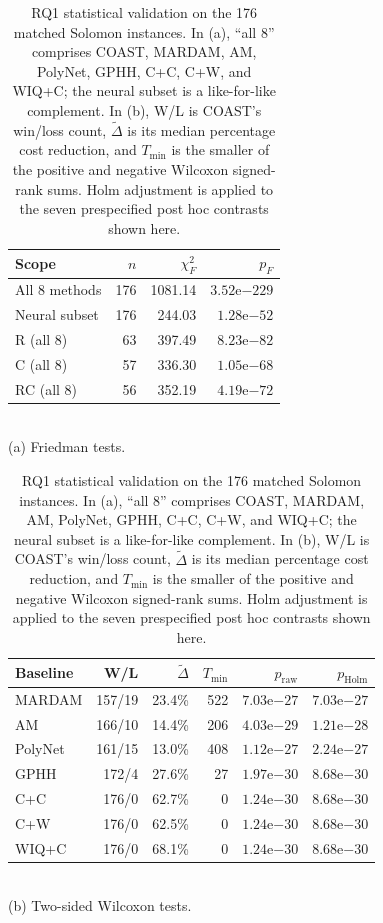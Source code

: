 \documentclass[letterpaper]{article}
\begin{document}
\begin{table}[t]
\centering
\begin{minipage}[t]{0.34\textwidth}
\centering
{\small
\setlength{\tabcolsep}{3.2pt}
\begin{tabular}{lrrr}
\toprule
Scope & $n$ & $\chi^2_F$ & $p_F$ \\
\midrule
All 8 methods & 176 & 1081.14 & $3.52\mathrm{e}{-229}$ \\
Neural subset & 176 & 244.03 & $1.28\mathrm{e}{-52}$ \\
R (all 8) & 63 & 397.49 & $8.23\mathrm{e}{-82}$ \\
C (all 8) & 57 & 336.30 & $1.05\mathrm{e}{-68}$ \\
RC (all 8) & 56 & 352.19 & $4.19\mathrm{e}{-72}$ \\
\bottomrule
\end{tabular}
}\\[1pt]
\footnotesize (a) Friedman tests.
\end{minipage}\hfill
\begin{minipage}[t]{0.62\textwidth}
\centering
{\small
\setlength{\tabcolsep}{3.0pt}
\begin{tabular}{lrrrrr}
\toprule
Baseline & W/L & $\tilde{\Delta}$ & $T_{\min}$ & $p_{\mathrm{raw}}$ & $p_{\mathrm{Holm}}$ \\
\midrule
MARDAM  & 157/19 & 23.4\% & 522 & $7.03\mathrm{e}{-27}$ & $7.03\mathrm{e}{-27}$ \\
AM      & 166/10 & 14.4\% & 206 & $4.03\mathrm{e}{-29}$ & $1.21\mathrm{e}{-28}$ \\
PolyNet & 161/15 & 13.0\% & 408 & $1.12\mathrm{e}{-27}$ & $2.24\mathrm{e}{-27}$ \\
GPHH    & 172/4  & 27.6\% & 27  & $1.97\mathrm{e}{-30}$ & $8.68\mathrm{e}{-30}$ \\
C+C     & 176/0  & 62.7\% & 0   & $1.24\mathrm{e}{-30}$ & $8.68\mathrm{e}{-30}$ \\
C+W     & 176/0  & 62.5\% & 0   & $1.24\mathrm{e}{-30}$ & $8.68\mathrm{e}{-30}$ \\
WIQ+C   & 176/0  & 68.1\% & 0   & $1.24\mathrm{e}{-30}$ & $8.68\mathrm{e}{-30}$ \\
\bottomrule
\end{tabular}
}\\[1pt]
\footnotesize (b) Two-sided Wilcoxon tests.
\end{minipage}
\caption{RQ1 statistical validation on the 176 matched Solomon instances. In (a), ``all 8'' comprises COAST, MARDAM, AM, PolyNet, GPHH, C+C, C+W, and WIQ+C; the neural subset is a like-for-like complement. In (b), W/L is COAST's win/loss count, $\tilde{\Delta}$ is its median percentage cost reduction, and $T_{\min}$ is the smaller of the positive and negative Wilcoxon signed-rank sums. Holm adjustment is applied to the seven prespecified post hoc contrasts shown here.}
\label{tab:rq1_statistics}
\end{table}
\end{document}
